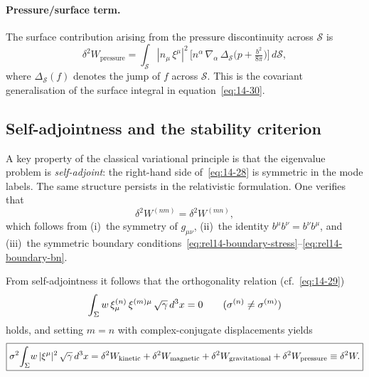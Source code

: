 \paragraph{Pressure/surface term.}
The surface contribution arising from the pressure discontinuity
across $\mathcal{S}$ is
\begin{equation}
  \delta^{2}W_{\mathrm{pressure}}
  = \int_{\mathcal{S}}
    |n_{\mu}\,\xi^{\mu}|^{2}\,
    \bigl[n^{\alpha}\,\nabla_{\alpha}\,
      \Delta_{\mathcal{S}}\!\bigl(p + \tfrac{b^{2}}{8\pi}\bigr)\bigr]\,
    d\mathcal{S},
  \label{eq:rel14-W-surface}
\end{equation}
where $\Delta_{\mathcal{S}}(f)$ denotes the jump of $f$ across
$\mathcal{S}$.  This is the covariant generalisation of the surface
integral in equation~\eqref{eq:14-30}.

\subsection{Self-adjointness and the stability
  criterion}\label{sec:rel-122-selfadjoint}

A key property of the classical variational principle is that the
eigenvalue problem is \emph{self-adjoint}: the right-hand side
of~\eqref{eq:14-28} is symmetric in the mode labels.  The same
structure persists in the relativistic formulation.  One verifies
that
\begin{equation}
  \delta^{2}W^{(nm)} = \delta^{2}W^{(mn)},
  \label{eq:rel14-selfadjoint}
\end{equation}
which follows from (i)~the symmetry of $g_{\mu\nu}$,
(ii)~the identity $b^{\mu}b^{\nu}=b^{\nu}b^{\mu}$, and
(iii)~the symmetric boundary
conditions~\eqref{eq:rel14-boundary-stress}--\eqref{eq:rel14-boundary-bn}.

From self-adjointness it follows that the orthogonality relation
(cf.~\eqref{eq:14-29})
\begin{equation}
  \int_{\Sigma}w\,
    \xi^{(n)}_{\mu}\,\xi^{(m)\mu}\,
    \sqrt{\gamma}\,d^{3}x = 0
  \qquad (\sigma^{(n)}\neq\sigma^{(m)})
  \label{eq:rel14-orthogonality}
\end{equation}
holds, and setting $m=n$ with complex-conjugate displacements yields
\begin{equation}
  \boxed{
  \sigma^{2}\!\int_{\Sigma}\!w\,
    |\xi^{\mu}|^{2}\,\sqrt{\gamma}\,d^{3}x
  = \delta^{2}W_{\mathrm{kinetic}}
  + \delta^{2}W_{\mathrm{magnetic}}
  + \delta^{2}W_{\mathrm{gravitational}}
  + \delta^{2}W_{\mathrm{pressure}}
  \equiv \delta^{2}W.}
  \label{eq:rel14-sigma2-deltaW}
\end{equation}

